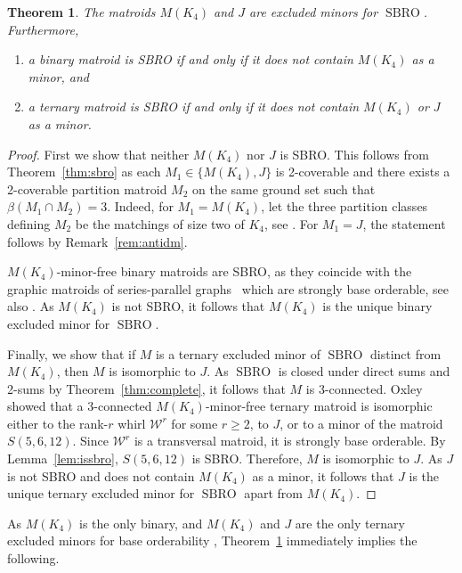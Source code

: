 \documentclass[11pt,a4paper]{article}
\theoremstyle{plain}
\newtheorem{thm}{Theorem}
\theoremstyle{definition}
\DeclareMathOperator*{\sbro}{SBRO}
\begin{document}
\begin{thm}\label{thm:binter}
The matroids $M(K_4)$ and $J$ are excluded minors for $\sbro$. Furthermore, 
\begin{enumerate}[label=(\alph*)]\itemsep0em
    \item a binary matroid is SBRO if and only if it does not contain $M(K_4)$ as a minor, and
    \item a ternary matroid is SBRO if and only if it does not contain $M(K_4)$ or $J$ as a minor.
\end{enumerate}
\end{thm}
\begin{proof}
First we show that neither $M(K_4)$ nor $J$ is SBRO. This follows from Theorem~\ref{thm:sbro} as each $M_1 \in \{M(K_4), J\}$ is 2-coverable and there exists a 2-coverable partition matroid $M_2$ on the same ground set such that $\beta(M_1\cap M_2)=3$. Indeed, for $M_1 = M(K_4)$, let the three partition classes defining $M_2$ be the matchings of size two of $K_4$, see \cite{schrijver2003combinatorial}. For $M_1 = J$, the statement follows by Remark~\ref{rem:antidm}.

$M(K_4)$-minor-free binary matroids are SBRO, as they coincide with the graphic matroids of series-parallel graphs~\cite{brylawski1971combinatorial} which are strongly base orderable, see also \cite{welsh1976matroid}. As $M(K_4)$ is not SBRO, it follows that $M(K_4)$ is the unique binary excluded minor for $\sbro$.

Finally, we show that if $M$ is a ternary excluded minor of $\sbro$ distinct from $M(K_4)$, then $M$ is isomorphic to $J$. As $\sbro$ is closed under direct sums and 2-sums by Theorem~\ref{thm:complete}, it follows that $M$ is 3-connected. Oxley~\cite{oxley1987characterization} showed that a 3-connected $M(K_4)$-minor-free ternary matroid is isomorphic either to the rank-$r$ whirl $\mathcal{W}^r$ for some $r\ge 2$, to $J$, or to a minor of the matroid $S(5,6,12)$. Since $\mathcal{W}^r$ is a transversal matroid, it is strongly base orderable. By Lemma~\ref{lem:issbro}, $S(5,6,12)$ is SBRO. Therefore, $M$ is isomorphic to $J$. As $J$ is not SBRO and does not contain $M(K_4)$ as a minor, it follows that $J$ is the unique ternary excluded minor for $\sbro$ apart from $M(K_4)$.
\end{proof}

As $M(K_4)$ is the only binary, and $M(K_4)$ and $J$ are the only ternary excluded minors for base orderability \cite{oxley1987characterization}, Theorem~\ref{thm:binter} immediately implies the following.
\end{document}
